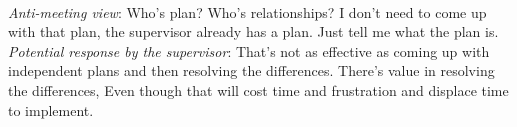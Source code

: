 \ \\
\textit{Anti-meeting view}: Who's plan? Who's relationships? I don't need to come up with that plan, the supervisor already has a plan. Just tell me what the plan is.\\
\textit{Potential response by the supervisor}: That's not as effective as coming up with independent plans and then resolving the differences. There's value in resolving the differences, Even though that will cost time and frustration and displace time to implement.

